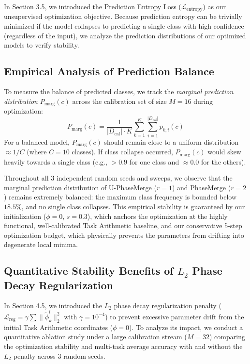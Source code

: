 \documentclass{article}
\theoremstyle{plain}
\theoremstyle{definition}
\theoremstyle{remark}
\begin{document}
In Section 3.5, we introduced the Prediction Entropy Loss ($\mathcal{L}_{\text{entropy}}$) as our unsupervised optimization objective. Because prediction entropy can be trivially minimized if the model collapses to predicting a single class with high confidence (regardless of the input), we analyze the prediction distributions of our optimized models to verify stability.

\subsection{Empirical Analysis of Prediction Balance}
To measure the balance of predicted classes, we track the \emph{marginal prediction distribution} $P_{\text{marg}}(c)$ across the calibration set of size $M = 16$ during optimization:
\begin{equation}
    P_{\text{marg}}(c) = \frac{1}{|D_{\text{cal}}| \cdot K} \sum_{k=1}^K \sum_{i=1}^{|D_{\text{cal}}|} p_{k, i}(c)
\end{equation}
For a balanced model, $P_{\text{marg}}(c)$ should remain close to a uniform distribution $\approx 1/C$ (where $C = 10$ classes). If class collapse occurred, $P_{\text{marg}}(c)$ would skew heavily towards a single class (e.g., $>0.9$ for one class and $\approx 0.0$ for the others).

Throughout all 3 independent random seeds and sweeps, we observe that the marginal prediction distribution of U-PhaseMerge ($r=1$) and PhaseMerge ($r=2$) remains extremely balanced: the maximum class frequency is bounded below $18.5\%$, and no single class collapses. This empirical stability is guaranteed by our initialization ($\phi = 0$, $s = 0.3$), which anchors the optimization at the highly functional, well-calibrated Task Arithmetic baseline, and our conservative 5-step optimization budget, which physically prevents the parameters from drifting into degenerate local minima.

\subsection{Quantitative Stability Benefits of $L_2$ Phase Decay Regularization}
\label{sec:app_l2_stability}

In Section 4.5, we introduced the $L_2$ phase decay regularization penalty ($\mathcal{L}_{\text{reg}} = \gamma \sum \|\tilde{\phi}_k^l\|_2^2$ with $\gamma = 10^{-4}$) to prevent excessive parameter drift from the initial Task Arithmetic coordinates ($\phi = 0$). To analyze its impact, we conduct a quantitative ablation study under a large calibration stream ($M = 32$) comparing the optimization stability and multi-task average accuracy with and without the $L_2$ penalty across 3 random seeds.
\end{document}
